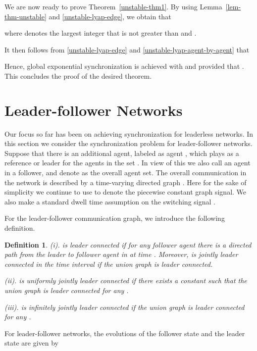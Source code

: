 \documentclass[a4paper, 11pt]{article}
\newtheorem{definition}{Definition}
\begin{document}
We are now ready to prove Theorem~\ref{unstable-thm1}.
By using Lemma~\ref{lem-thm-unstable} and \eqref{unstable-lyap-edge}, we obtain that

where  denotes the largest integer that is not greater than
 and .

It then follows from \eqref{unstable-lyap-edge} and \eqref{unstable-lyap-agent-by-agent} that

Hence, global exponential synchronization is achieved with 
and  provided that .
This concludes the proof of the desired theorem.






\section{Leader-follower Networks}\label{sec-lf}

Our focus so far has been on achieving synchronization for leaderless networks.
In this section we consider the synchronization problem for leader-follower networks.
Suppose that there is an additional agent, labeled as agent ,
which plays as a reference or leader for the agents in the set .
In view of this we also call an agent in  a follower, and denote   as the overall agent set. The overall communication in the network is described by a time-varying directed graph . Here for the sake of simplicity we continue to use  to denote the piecewise constant graph signal.
We also make a standard dwell time assumption \cite{liberzon-morse} on  the switching signal . 

For the leader-follower communication graph, we introduce the following definition.
\begin{definition}\label{def-connected-leader}
(i).  is \emph{leader connected} if
for any follower agent 
there is a directed path from the leader  to follower agent  in 
at time .
Moreover,  is \emph{jointly leader connected} in the time interval  if the union graph  is leader connected.

(ii).  is {\emph{uniformly jointly leader connected}} if there exists a constant  such that the union graph  is leader connected for any .

(iii).  is {\emph{infinitely jointly leader connected}} if the union graph  is leader connected for any .
\end{definition}

For leader-follower  networks, the evolutions of the follower state  and the leader state
 are given by
\end{document}
